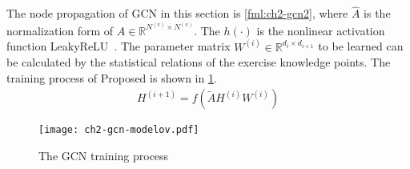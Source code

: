 
The node propagation of GCN in this section is \ref{fml:ch2-gcn2}, where \(\widehat{A}\) is the normalization form of \(A\in \mathbb{R}^{N^{(v)}\times N^{(v)}}\). The \(h(\cdot)\) is the nonlinear activation function LeakyReLU~\cite{maas2013rectifier}. The parameter matrix \(W^{(i)}\in \mathbb{R}^{d_{i}\times d_{i+1}}\) to be learned can be calculated by the statistical relations of the exercise knowledge points. The training process of Proposed is shown in \figurename{\ref{fig:ch2-gcn-explain}}.
\begin{align}
	H^{(i+1)} = f(\tilde{A}H^{(i)}W^{(i)})\label{fml:ch2-gcn2}
\end{align}

\begin{figure}[H]
	\centering
	\texttt{[image: ch2-gcn-modelov.pdf]}
	\caption{The GCN training process}\label{fig:ch2-gcn-explain}
\end{figure}




